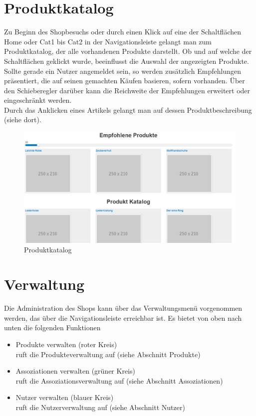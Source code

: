 \section{Produktkatalog}
Zu Beginn des Shopbesuchs oder durch einen Klick auf eine der Schaltflächen Home oder Cat1 bis Cat2 in der Navigationsleiste gelangt man zum Produktkatalog, der alle vorhandenen Produkte darstellt. Ob und auf welche der Schaltflächen geklickt wurde, beeinflusst die Auswahl der angezeigten Produkte. \\
Sollte gerade ein Nutzer angemeldet sein, so werden zusätzlich Empfehlungen prä\-sen\-tiert, die auf seinen gemachten Käufen basieren, sofern vorhanden. Über den Schieberegler darüber kann die Reichweite der Empfehlungen erweitert oder eingeschränkt werden. \\
Durch das Anklicken eines Artikels gelangt man auf dessen Produktbeschreibung (siehe dort).

\begin{figure}[h!]
  \centering
  \includegraphics[width=\textwidth]{UserManual/Produktkatalog.png}
  \caption{Produktkatalog}
  \label{fig:Produktkatalog}
\end{figure}


\section{Verwaltung}
Die Administration des Shops kann über das Verwaltungsmenü vorgenommen werden, das über die Navigationsleiste erreichbar ist. Es bietet von oben nach unten die folgenden Funktionen
\begin{itemize}
  \item Produkte verwalten (roter Kreis) \\
        ruft die Produkteverwaltung auf (siehe Abschnitt Produkte)
  \vspace*{-0.5em}
  \item Assoziationen verwalten (grüner Kreis) \\
        ruft die Assoziationsverwaltung auf (siehe Abschnitt Assoziationen)
  \vspace*{-0.5em}
  \item Nutzer verwalten (blauer Kreis) \\
        ruft die Nutzerverwaltung auf (siehe Abschnitt Nutzer)
\end{itemize}

